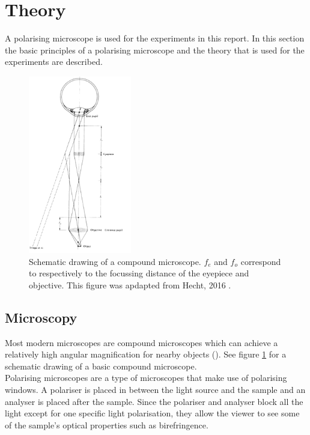 \section{Theory}

A polarising microscope is used for the experiments in this report. In this section the basic principles of a polarising microscope and the theory that is used for the experiments are described.\\

\begin{figure}
	\vspace{-5mm}
	\centering
    \includegraphics[width=0.4\textwidth]{afbeeldingen/compound_microscope.png}
  	\caption{Schematic drawing of a compound microscope. $f_{e}$ and $f_{o}$ correspond to respectively to the focussing distance of the eyepiece and objective. This figure was apdapted from Hecht, 2016 \cite{hecht}.}
  	\label{fig_compound_microscope}
\end{figure}

\subsection{Microscopy}
Most modern microscopes are compound microscopes which can achieve a relatively high angular magnification for nearby objects (\cite{hecht}). See figure \ref{fig_compound_microscope} for a schematic drawing of a basic compound microscope.\\
Polarising microscopes are a type of microscopes that make use of polarising windows. A polariser is placed in between the light source and the sample and an analyser is placed after the sample. Since the polariser and analyser block all the light except for one specific light polarisation, they allow the viewer to see some of the sample's optical properties such as birefringence. \\

